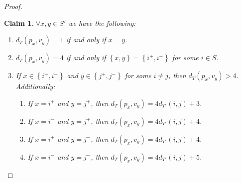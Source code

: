 \documentclass[11pt, letter]{article}
\newtheorem{claim}[theorem]{Claim}
\theoremstyle{remark}
\newcommand{\set}[1]{\left\{#1\right\}}
\begin{document}
\begin{proof}
\begin{claim}\label{cl:p-dist-exact}
    $\forall x,y\in S'$ we have the following:
    \begin{enumerate}
        \item $d_T(p_x,v_y)=1$ if and only if $x=y$.
        \item $d_T(p_x,v_y)=4$ if and only if $\set{x,y}=\set{i^+,i^-}$ for some $i\in S$.
        \item If $x\in \set{i^+,i^-}$ and $y\in \set{j^+,j^-}$ for some $i\neq j$, then $d_T(p_x,v_y)>4$. Additionally:
        \begin{enumerate}
            \item If $x=i^+$ and $y=j^+$, then $d_T(p_x,v_y)=4d_{T'}(i,j)+3$.
            \item If $x=i^-$ and $y=j^+$, then $d_T(p_x,v_y)=4d_{T'}(i,j)+4$.
            \item If $x=i^+$ and $y=j^-$, then $d_T(p_x,v_y)=4d_{T'}(i,j)+4$.
            \item If $x=i^-$ and $y=j^-$, then $d_T(p_x,v_y)=4d_{T'}(i,j)+5$.
        \end{enumerate}
    \end{enumerate}
\end{claim}


\end{proof}
\end{document}

